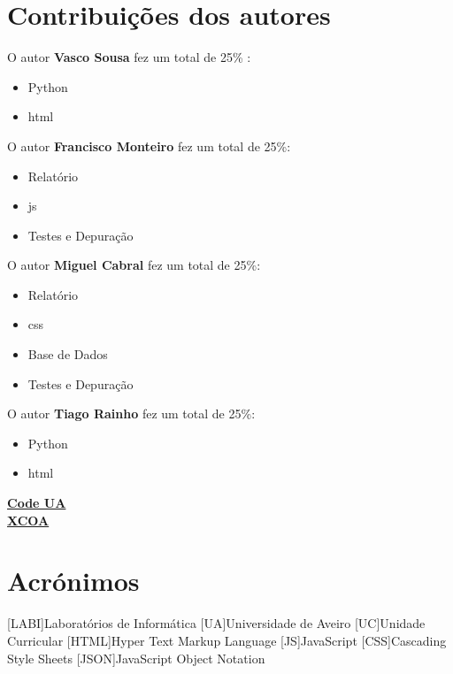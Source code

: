 \documentclass{report}
\begin{document}
\chapter*{Contribuições dos autores}
O autor \textbf{Vasco Sousa} fez um total de 25\% :
\begin{itemize}
    \item Python
    \item \ac{html}
\end{itemize}
O autor \textbf{Francisco Monteiro} fez um total de 25\%:
\begin{itemize}
    \item Relatório
    \item \ac{js}
    \item Testes e Depuração
\end{itemize}
O autor \textbf{Miguel Cabral} fez um total de 25\%:
\begin{itemize}
    \item Relatório
    \item \ac{css}
    \item Base de Dados
    \item Testes e Depuração
\end{itemize}
O autor \textbf{Tiago Rainho} fez um total de 25\%:
\begin{itemize}
    \item Python
    \item \ac{html}
\end{itemize}
\vspace{10mm}
\begin{center}\LARGE{
\href{https://code.ua.pt/projects/labi2019-p2-g12}{\textbf{Code UA}}\\
\vspace{3mm}
\href{https://xcoa.av.it.pt/labi2019-p2-g12/}{\textbf{XCOA}}
}\end{center}

\chapter*{Acrónimos}
\begin{acronym}
[LABI]{Laboratórios de Informática}
[UA]{Universidade de Aveiro}
[UC]{Unidade Curricular}
[HTML]{Hyper Text Markup Language}
[JS]{JavaScript}
[CSS]{Cascading Style Sheets}
[JSON]{JavaScript Object Notation}

\end{acronym}
\end{document}
